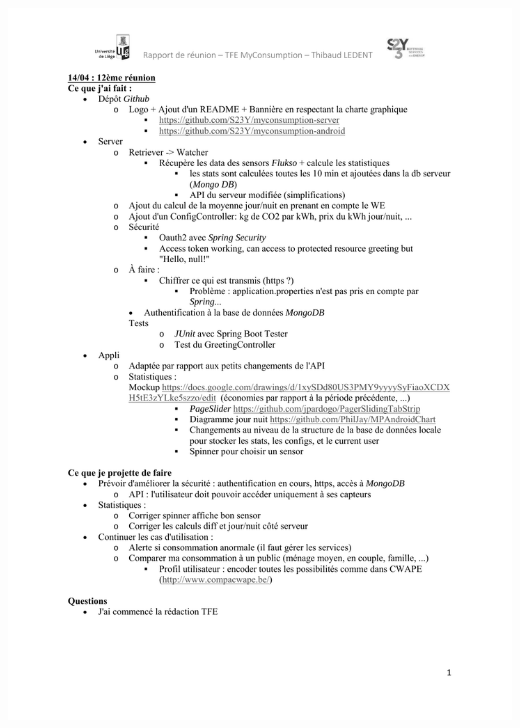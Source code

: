 \documentclass[a4paper, oneside, 11pt]{book}
\begin{document}
\includegraphics[width=1\textwidth]{reports_NB_Part13.pdf}
\newpage
\end{document}
